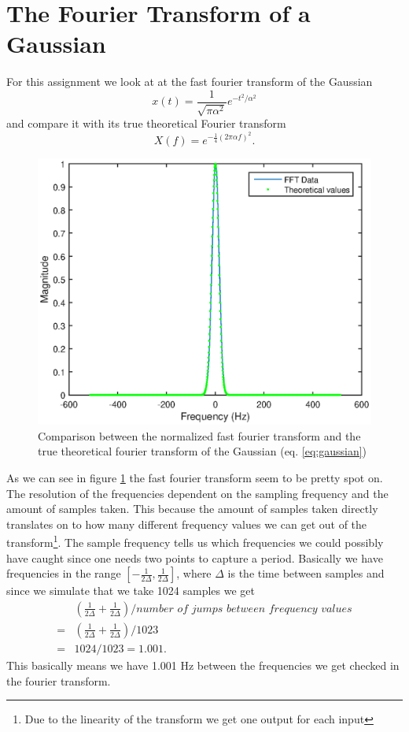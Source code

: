 \documentclass[11pt]{article}
\begin{document}
\section{The Fourier Transform of a Gaussian}
For this assignment we look at at the fast fourier transform of the Gaussian
\begin{equation}
	x(t) = \frac{1}{\sqrt{\pi \alpha^2}} e^{-t^2/\alpha^2}
	\label{eq:gaussian}
\end{equation}
and compare it with its true theoretical Fourier transform
\begin{equation}
	X(f) = e^{-\frac{1}{4} (2 \pi \alpha f)^2}.
	\label{eq:guassianFFT}
\end{equation}
\begin{figure}[H]
	\centering
	\includegraphics[width=1\textwidth]{../ex1/gaussianFFT}
	\caption{Comparison between the normalized fast fourier transform and the true theoretical fourier transform of the Gaussian (eq. \ref{eq:gaussian})}
	\label{fig:gaussianFFT}
\end{figure}

As we can see in figure \ref{fig:gaussianFFT} the fast fourier transform seem to be pretty spot on. The resolution of the frequencies dependent on the sampling frequency and the amount of samples taken. This because the amount of samples taken directly translates on to how many different frequency values we can get out of the transform\footnote{Due to the linearity of the transform we get one output for each input}. The sample frequency tells us which frequencies we could possibly have caught since one needs two points to capture a period. Basically we have frequencies in the range $[-\frac{1}{2 \Delta},\frac{1}{2 \Delta}]$, where $\Delta$ is the time between samples and since we simulate that we take 1024 samples we get 
\begin{align}
	&(\frac{1}{2 \Delta} +\frac{1}{2 \Delta})/\textit{number of jumps between frequency values} \\ 
	=& (\frac{1}{2\Delta} +\frac{1}{2\Delta})/1023\\
	=& 1024/1023 = 1.001.
\end{align}
This basically means we have 1.001 Hz between the frequencies we get checked in the fourier transform.
\end{document}
